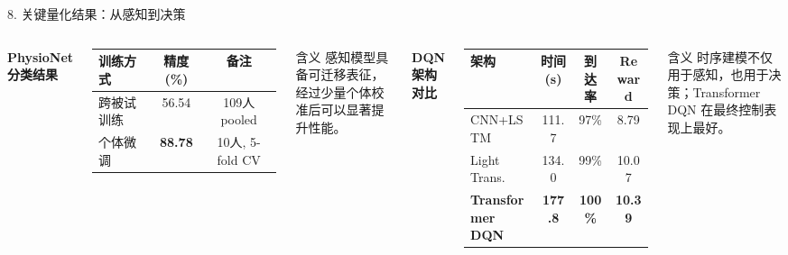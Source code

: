 \documentclass[UTF8,aspectratio=169,11pt]{ctexbeamer}
\begin{document}
\begin{frame}[shrink=8]{8. 关键量化结果：从感知到决策}
    \begin{columns}[T]
        \textbf{PhysioNet 分类结果}
        \begin{table}
            \centering
            \scriptsize
            \begin{tabular}{p{2.9cm}cc}
                \toprule
                训练方式 & 精度(\%) & 备注 \\
                \midrule
                跨被试训练 & 56.54 & 109人 pooled \\
                个体微调 & \textbf{88.78} & 10人, 5-fold CV \\
                \bottomrule
            \end{tabular}
        \end{table}

        \vspace{2mm}
        \begin{exampleblock}{含义}
            感知模型具备可迁移表征，经过少量个体校准后可以显著提升性能。
        \end{exampleblock}

        \textbf{DQN 架构对比}
        \begin{table}
            \centering
            \scriptsize
            \begin{tabular}{lccc}
                \toprule
                架构 & 时间(s) & 到达率 & Reward \\
                \midrule
                CNN+LSTM & 111.7 & 97\% & 8.79 \\
                Light Trans. & 134.0 & 99\% & 10.07 \\
                \textbf{Transformer DQN} & \textbf{177.8} & \textbf{100\%} & \textbf{10.39} \\
                \bottomrule
            \end{tabular}
        \end{table}

        \vspace{2mm}
        \begin{alertblock}{含义}
            时序建模不仅用于感知，也用于决策；Transformer DQN 在最终控制表现上最好。
        \end{alertblock}
    \end{columns}
\end{frame}
\end{document}
